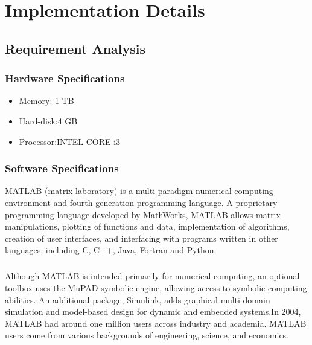 \chapter{Implementation Details}
\section{Requirement Analysis}
\subsection{Hardware Specifications}
\begin{itemize}
\item Memory: 1 TB
\item Hard-disk:4 GB
\item Processor:INTEL CORE i3
\end{itemize}

\subsection{Software Specifications}
MATLAB (matrix laboratory) is a multi-paradigm numerical computing environment and fourth-generation programming language. A proprietary programming language developed by MathWorks, MATLAB allows matrix manipulations, plotting of functions and data, implementation of algorithms, creation of user interfaces, and interfacing with programs written in other languages, including C, C++, Java, Fortran and Python.

\paragraph{} Although MATLAB is intended primarily for numerical computing, an optional toolbox uses the MuPAD symbolic engine, allowing access to symbolic computing abilities. An additional package, Simulink, adds graphical multi-domain simulation and model-based design for dynamic and embedded systems.In 2004, MATLAB had around one million users across industry and academia. MATLAB users come from various backgrounds of engineering, science, and economics.

